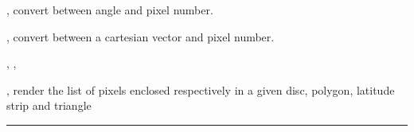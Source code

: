 \begin{related}
  \begin{sulist}{} %
  \item[\htmlref{pix2ang}{sub:pix_tools}, \htmlref{ang2pix}{sub:pix_tools}] convert between angle and pixel number.
  \item[\htmlref{pix2vec}{sub:pix_tools}, \htmlref{vec2pix}{sub:pix_tools}] convert between a cartesian vector and pixel number.
  \item[\htmlref{query\_disc}{sub:query_disc}, \htmlref{query\_polygon}{sub:query_polygon},]
  \item[\htmlref{query\_strip}{sub:query_strip}, \htmlref{query\_triangle}{sub:query_triangle}] render the list of pixels enclosed
  respectively in a given disc, polygon, latitude strip and triangle

  \end{sulist}
\end{related}

\rule{\hsize}{2mm}

\newpage
